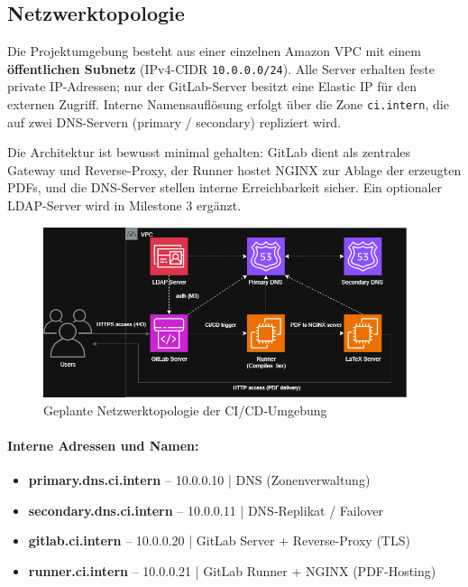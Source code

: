 \documentclass[a4paper,12pt]{article}
\begin{document}
\subsection*{Netzwerktopologie}

Die Projektumgebung besteht aus einer einzelnen Amazon VPC mit einem
\textbf{öffentlichen Subnetz} (IPv4-CIDR \texttt{10.0.0.0/24}). Alle Server
erhalten feste private IP-Adressen; nur der GitLab-Server besitzt eine
Elastic IP für den externen Zugriff. Interne Namensauflösung erfolgt über
die Zone \texttt{ci.intern}, die auf zwei DNS-Servern (primary / secondary)
repliziert wird. 

Die Architektur ist bewusst minimal gehalten:
GitLab dient als zentrales Gateway und Reverse-Proxy,
der Runner hostet NGINX zur Ablage der erzeugten PDFs,
und die DNS-Server stellen interne Erreichbarkeit sicher.
Ein optionaler LDAP-Server wird in Milestone 3 ergänzt.

\begin{figure}[H]
  \centering
  \includegraphics[width=0.95\textwidth]{assets/aws-diagramm-dark.png}
  \caption{Geplante Netzwerktopologie der CI/CD‑Umgebung}
\end{figure}


\paragraph{Interne Adressen und Namen:}
\begin{itemize}
  \item \textbf{primary.dns.ci.intern} – 10.0.0.10  | DNS (Zonenverwaltung)
  \item \textbf{secondary.dns.ci.intern} – 10.0.0.11  | DNS-Replikat / Failover
  \item \textbf{gitlab.ci.intern} – 10.0.0.20  | GitLab Server + Reverse-Proxy (TLS)
  \item \textbf{runner.ci.intern} – 10.0.0.21  | GitLab Runner + NGINX (PDF-Hosting)
\end{itemize}
\end{document}
